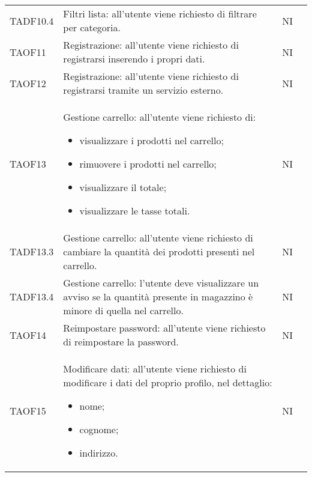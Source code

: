\begin{center}
\begin{longtable}[!h]{p{50px} p{245px} p{75px} p{50px}}
        TADF10.4                         & Filtri lista: all'utente viene richiesto di filtrare per categoria.                                                                                                 & NI             \\
        TAOF11                           & Registrazione: all'utente viene richiesto di registrarsi inserendo i propri dati.                                                                                   & NI             \\
        TAOF12                           & Registrazione: all'utente viene richiesto di registrarsi tramite un servizio esterno.                                                                               & NI             \\
        TAOF13                           & Gestione carrello: all'utente viene richiesto di: \begin{itemize} \item visualizzare i prodotti nel carrello; \item rimuovere i prodotti nel carrello; \item visualizzare il totale; \item visualizzare le tasse totali. \end{itemize}                                                                                        & NI             \\
        TADF13.3                         & Gestione carrello: all'utente viene richiesto di cambiare la quantità dei prodotti presenti nel carrello.                                                           & NI             \\
        TADF13.4                         & Gestione carrello: l'utente deve visualizzare un avviso se la quantità presente in magazzino è minore di quella nel carrello.                                       & NI             \\
        TAOF14                           & Reimpostare password: all'utente viene richiesto di reimpostare la password.                                                                                        & NI             \\
        TAOF15                           & Modificare dati: all'utente viene richiesto di modificare i dati del proprio profilo, nel dettaglio: \begin{itemize} \item nome; \item cognome; \item indirizzo. \end{itemize}                                     & NI             \\

\end{longtable}
\end{center}
